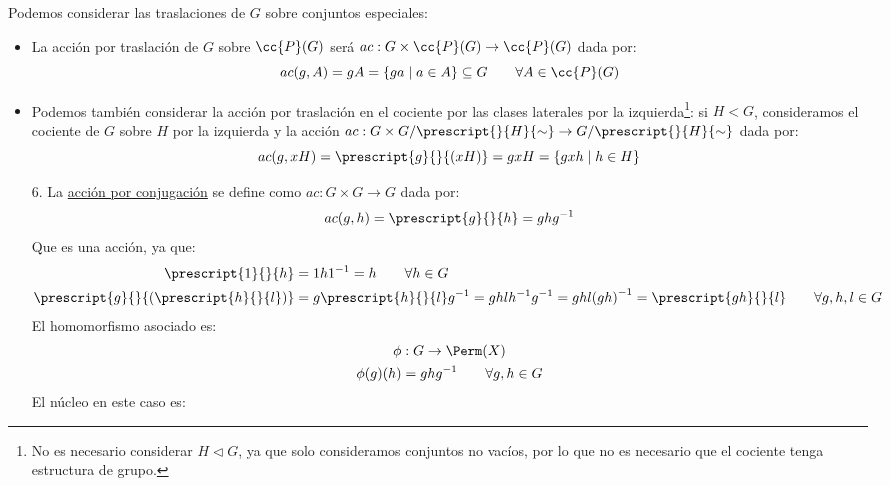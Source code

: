 \begin{ejemplo}
    Podemos considerar las traslaciones de $G$ sobre conjuntos especiales:
    \begin{itemize}
        \item La acción por traslación de $G$ sobre $\cc{P}(G)$ será $ac:G\times \cc{P}(G) \to \cc{P}(G)$ dada por:
            \begin{equation*}
                ac(g,A) = gA = \{ga \mid a\in A\}  \subseteq G \qquad \forall A\in \cc{P}(G)
            \end{equation*}
        \item Podemos también considerar la acción por traslación en el cociente por las clases laterales por la izquierda\footnote{No es necesario considerar $H\lhd G$, ya que solo consideramos conjuntos no vacíos, por lo que no es necesario que el cociente tenga estructura de grupo.}: si $H<G$, consideramos el cociente de $G$ sobre $H$ por la izquierda y la acción $ac:G\times G/\prescript{}{H}{\sim} \to G/\prescript{}{H}{\sim}$ dada por:
            \begin{equation*}
                ac(g,xH) = \prescript{g}{}{(xH)} = gxH  = \{gxh \mid h\in H\}
            \end{equation*}
    \end{itemize}
    \begin{enumerate}
        \item[6.] La \underline{acción por conjugación} se define como $ac:G\times G\to G$ dada por:
            \begin{equation*}
                ac(g,h) = \prescript{g}{}{h} = ghg^{-1}
            \end{equation*}
            Que es una acción, ya que:
            \begin{align*}
                \prescript{1}{}{h} &= 1h1^{-1} = h \qquad \forall h\in G\\
                \prescript{g}{}{(\prescript{h}{}{l})} &= g\prescript{h}{}{l}g^{-1} = ghlh^{-1}g^{-1} = ghl{(gh)}^{-1} = \prescript{gh}{}{l} \qquad \forall g,h,l \in G
            \end{align*}
            El homomorfismo asociado es:
            \begin{gather*}
                \phi:G\to\Perm(X) \\
                \phi(g)(h) = ghg^{-1} \qquad \forall g,h\in G
            \end{gather*}
            El núcleo en este caso es:
            \begin{equation*}

\end{equation*}
\end{enumerate}
\end{ejemplo}
